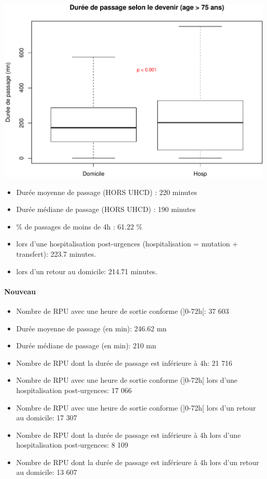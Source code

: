 \documentclass[]{article}
\begin{document}
\includegraphics{rapport2014_V4_files/figure-latex/duree_passage_75-1.pdf}

\begin{itemize}
\itemsep1pt\parskip0pt
\item
  Durée moyenne de passage (HORS UHCD) : 220 minutes
\item
  Durée médiane de passage (HORS UHCD) : 190 minutes
\item
  \% de passages de moins de 4h : 61.22 \%
\item
  lors d'une hospitalisation post-urgences (hospitalisation = mutation +
  transfert): 223.7 minutes.
\item
  lors d'un retour au domicile: 214.71 minutes.
\end{itemize}

\paragraph{Nouveau}\label{nouveau}

\begin{itemize}
\item
  Nombre de RPU avec une heure de sortie conforme ({]}0-72h{[}: 37 603
\item
  Durée moyenne de passage (en min): 246.62 mn
\item
  Durée médiane de passage (en min): 210 mn
\item
  Nombre de RPU dont la durée de passage est inférieure à 4h: 21 716
\item
  Nombre de RPU avec une heure de sortie conforme ({]}0-72h{[} lors
  d'une hospitalisation post-urgences: 17 066
\item
  Nombre de RPU avec une heure de sortie conforme ({]}0-72h{[} lors d'un
  retour au domicile: 17 307
\item
  Nombre de RPU dont la durée de passage est inférieure à 4h lors d'une
  hospitalisation post-urgences: 8 109
\item
  Nombre de RPU dont la durée de passage est inférieure à 4h lors d'un
  retour au domicile: 13 607
\end{itemize}
\end{document}
